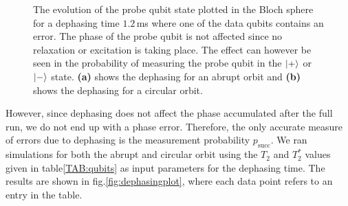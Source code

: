 \begin{figure}[H]
	\caption[oddeven]{The evolution of the probe qubit state plotted in the Bloch sphere for a dephasing time $1.2\, $ms where one of the data qubits contains an error. The phase of the probe qubit is not affected since no relaxation or excitation is taking place. The effect can however be seen in the probability of measuring the probe qubit in the $\ket{+}$ or $\ket{-}$ state. \textbf{(a)} shows the dephasing for an abrupt orbit and \textbf{(b)} shows the dephasing for a circular orbit.}
	\label{FIG:deph}
\end{figure}


However, since dephasing does not affect the phase accumulated after the full run, we do not end up with a phase error. Therefore, the only accurate measure of errors due to dephasing is the measurement probability $p_{\mathrm{succ}}$. We ran simulations for both the abrupt and circular orbit using the $T_2$ and $T_2^*$ values given in table\@ \ref{TAB:qubits} as input parameters for the dephasing time. The results are shown in fig.\@ \ref{fig:dephasingplot}, where each data point refers to an entry in the table. 

